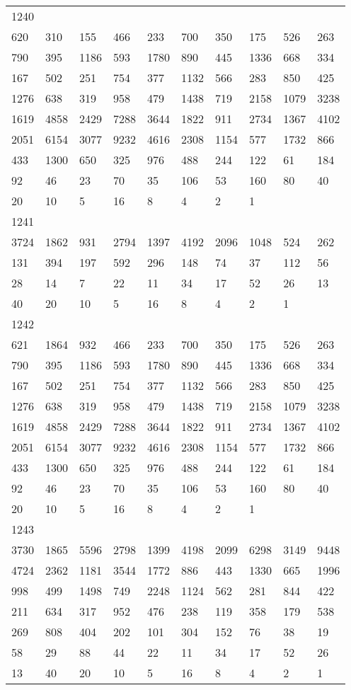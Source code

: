 \begin{longtable}{*{10}{l}}
1240&&&&&&&&&\\
620& 310& 155& 466& 233& 700& 350& 175& 526& 263\\
790& 395& 1186& 593& 1780& 890& 445& 1336& 668& 334\\
167& 502& 251& 754& 377& 1132& 566& 283& 850& 425\\
1276& 638& 319& 958& 479& 1438& 719& 2158& 1079& 3238\\
1619& 4858& 2429& 7288& 3644& 1822& 911& 2734& 1367& 4102\\
2051& 6154& 3077& 9232& 4616& 2308& 1154& 577& 1732& 866\\
433& 1300& 650& 325& 976& 488& 244& 122& 61& 184\\
92& 46& 23& 70& 35& 106& 53& 160& 80& 40\\
20& 10& 5& 16& 8& 4& 2& 1& \\

1241&&&&&&&&&\\
3724& 1862& 931& 2794& 1397& 4192& 2096& 1048& 524& 262\\
131& 394& 197& 592& 296& 148& 74& 37& 112& 56\\
28& 14& 7& 22& 11& 34& 17& 52& 26& 13\\
40& 20& 10& 5& 16& 8& 4& 2& 1& \\

1242&&&&&&&&&\\
621& 1864& 932& 466& 233& 700& 350& 175& 526& 263\\
790& 395& 1186& 593& 1780& 890& 445& 1336& 668& 334\\
167& 502& 251& 754& 377& 1132& 566& 283& 850& 425\\
1276& 638& 319& 958& 479& 1438& 719& 2158& 1079& 3238\\
1619& 4858& 2429& 7288& 3644& 1822& 911& 2734& 1367& 4102\\
2051& 6154& 3077& 9232& 4616& 2308& 1154& 577& 1732& 866\\
433& 1300& 650& 325& 976& 488& 244& 122& 61& 184\\
92& 46& 23& 70& 35& 106& 53& 160& 80& 40\\
20& 10& 5& 16& 8& 4& 2& 1& \\

1243&&&&&&&&&\\
3730& 1865& 5596& 2798& 1399& 4198& 2099& 6298& 3149& 9448\\
4724& 2362& 1181& 3544& 1772& 886& 443& 1330& 665& 1996\\
998& 499& 1498& 749& 2248& 1124& 562& 281& 844& 422\\
211& 634& 317& 952& 476& 238& 119& 358& 179& 538\\
269& 808& 404& 202& 101& 304& 152& 76& 38& 19\\
58& 29& 88& 44& 22& 11& 34& 17& 52& 26\\
13& 40& 20& 10& 5& 16& 8& 4& 2& 1\\


\end{longtable}
